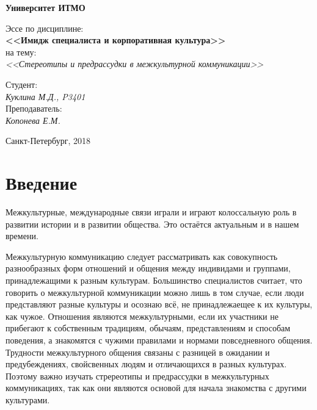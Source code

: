\documentclass[14pt, a4paper] {ncc}
\begin{document}
\frenchspacing
\pagestyle{empty}
\begin{center}
                            {\bf Университет ИТМО    \\}

\end{center}
\begin{center}

			Эссе по дисциплине:\\ {\bf <<Имидж специалиста и корпоративная культура>> \\}
			на тему: \\
	{\it <<Стереотипы и предрассудки в межкультурной коммуникации>> \\ }
\end{center}
\begin{flushright}
                                    Студент:\\
                                    {\it Куклина М.Д., P3401}\\
                                    Преподаватель: \\
                                    {\it Копонева Е.М.}
\end{flushright}
\begin{center}
                             Санкт-Петербург, 2018
\end{center}
\newpage

\tableofcontents

\newpage
\section{Введение}

	Межкультурные, международные связи играли и играют колоссальную роль в
	развитии истории и в развитии общества. Это остаётся актуальным и в нашем времени.

	Межкультурную коммуникацию следует рассматривать как совокупность разнообразных
	форм отношений и общения между индивидами и группами, принадлежащими к
	разным культурам. Большинство специалистов считает, что говорить о
	межкультурной коммуникации можно лишь в том случае, если люди
	представляют разные культуры и осознаю всё, не принадлежаещее к их
	культуры, как чужое. Отношения являются межкультурными, если
	их участники не прибегают к собственным традициям, обычаям,
	представлениям и способам поведения, а знакомятся с чужими
	правилами и нормами повседневного общения. \cite{Grush}
	Трудности межкультурного общения связаны с разницей в ожидании и
	предубеждениях, свойсвенных людям и отличающихся в разных культурах.
	Поэтому важно изучать стререотипы и предрассудки в межкультурных
	коммуникациях, так как они являются основой для начала знакомства
	с другими культурами.
\end{document}
